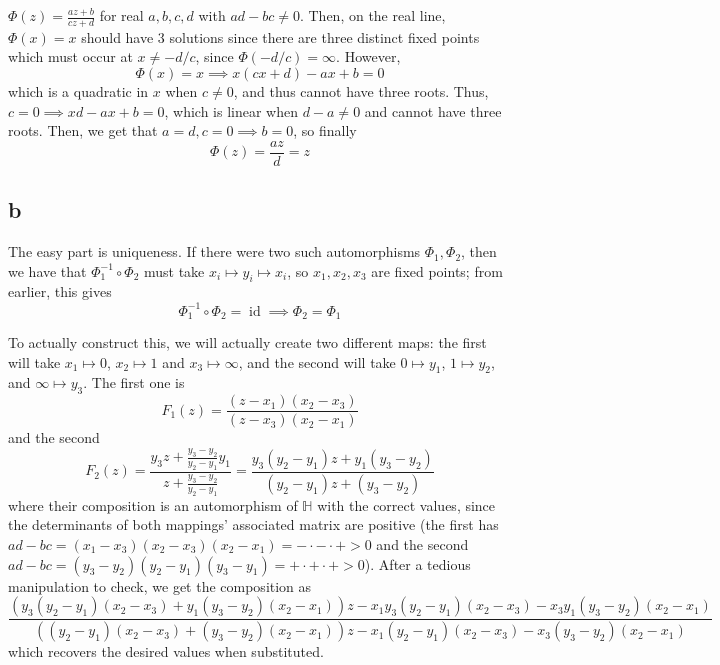 \documentclass[12pt,letterpaper]{article}
\theoremstyle{definition}
\newcommand{\Ha}{\mathbb{H}}
\DeclareMathOperator{\id}{id}
\begin{document}
$\Phi(z) = \frac{az + b}{cz + d}$ for real $a,b,c,d$ with $ad - bc \neq 0$. Then, on the real line, $\Phi(x) = x$ should have 3 solutions since there are three distinct fixed points which must occur at $x \neq -d/c$, since $\Phi(-d/c) = \infty$. However,
\[
  \Phi(x) = x \implies x(cx + d) - ax + b = 0
\]
which is a quadratic in $x$ when $c \neq 0$, and thus cannot have three roots. Thus, $c = 0 \implies xd - ax + b = 0$, which is linear when $d - a \neq 0$ and cannot have three roots. Then, we get that $a = d, c = 0 \implies b = 0$, so finally
\[
  \Phi(z) = \frac{az}{d} = z
\]

\subsection*{b}

The easy part is uniqueness. If there were two such automorphisms $\Phi_{1}, \Phi_{2}$, then we have that $\Phi_{1}^{-1} \circ \Phi_{2}$ must take $x_{i} \mapsto y_{i} \mapsto x_{i}$, so $x_{1}, x_{2}, x_{3}$ are fixed points; from earlier, this gives
\[
  \Phi_{1}^{-1} \circ \Phi_{2} = \id \implies \Phi_{2} = \Phi_{1}
\]

To actually construct this, we will actually create two different maps: the first will take $x_{1} \mapsto 0$, $x_{2} \mapsto 1$ and $x_{3} \mapsto \infty$, and the second will take $0 \mapsto y_{1}$, $1 \mapsto y_{2}$, and $\infty \mapsto y_{3}$. The first one is
\[
  F_{1}(z) = \frac{(z - x_{1})(x_{2} - x_{3})}{(z - x_{3})(x_{2} - x_{1})}
\]
and the second
\[
  F_{2}(z) = \frac{y_{3}z + \frac{y_{3} - y_{2}}{y_{2} - y_{1}}y_{1}}{z + \frac{y_{3} - y_{2}}{y_{2} - y_{1}}} = \frac{y_{3}(y_{2} - y_{1})z + y_{1}(y_{3} - y_{2})}{(y_{2} - y_{1})z + (y_{3} - y_{2})}
\]
where their composition is an automorphism of $\Ha$ with the correct values, since the determinants of both mappings' associated matrix are positive (the first has $ad - bc = (x_{1} - x_{3})(x_{2} - x_{3})(x_{2} - x_{1}) = - \cdot - \cdot + > 0$ and the second $ad - bc = (y_{3} - y_{2})(y_{2} - y_{1})(y_{3} - y_{1}) = + \cdot + \cdot + > 0$). After a tedious manipulation to check, we get the composition as
\[
  \frac{(y_{3}(y_{2} - y_{1})(x_{2} - x_{3}) + y_{1}(y_{3} - y_{2})(x_{2} - x_{1}))z - x_{1}y_{3}(y_{2} - y_{1})(x_{2} - x_{3}) - x_{3}y_{1}(y_{3} - y_{2})(x_{2} - x_{1})}{((y_{2} - y_{1})(x_{2} - x_{3}) + (y_{3} - y_{2})(x_{2} - x_{1}))z - x_{1}(y_{2} - y_{1})(x_{2} - x_{3}) - x_{3}(y_{3} - y_{2})(x_{2} - x_{1})}
\]
which recovers the desired values when substituted.
\end{document}
